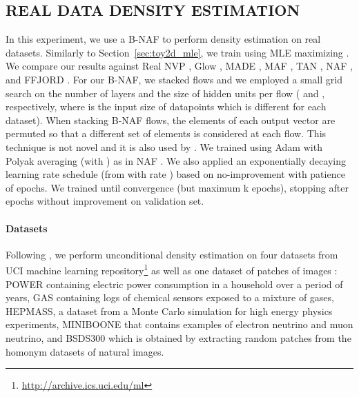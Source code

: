 \documentclass[letterpaper]{article}
\begin{document}
\subsection{REAL DATA DENSITY ESTIMATION} \label{sec:density_estimation}
In this experiment, we use a B-NAF to perform density estimation on  real datasets. Similarly to Section~\ref{sec:toy2d_mle}, we train using MLE maximizing . We compare our results against Real NVP \citep{dinh2016density}, Glow \citep{kingma2018glow}, MADE \citep{germain2015made}, MAF \citep{papamakarios2017masked}, TAN \citep{pmlr-v80-oliva18a}, NAF \citep{huang2018neural}, and FFJORD \citep{grathwohl2018ffjord}. For our B-NAF, we stacked  flows and we employed a small grid search on the number of layers and the size of hidden units per flow ( and , respectively, where  is the input size of datapoints which is different for each dataset). When stacking B-NAF flows, the elements of each output vector are permuted so that a different set of elements is considered at each flow. This technique is not novel and it is also used by \citet{dinh2016density, papamakarios2017masked, kingma2016improved}. We trained using Adam with Polyak averaging (with ) as in NAF \citep{polyak1992acceleration}. We also applied an exponentially decaying learning rate schedule (from  with rate ) based on no-improvement with patience of  epochs. We trained until convergence (but maximum k epochs), stopping after  epochs without improvement on validation set.

\paragraph{Datasets} Following \citet{papamakarios2017masked}, we perform unconditional density estimation on four datasets \citep{dua2017} from UCI machine learning repository\footnote{\url{http://archive.ics.uci.edu/ml}} as well as one dataset of patches of images \citep{martin2001database}: POWER containing electric power consumption in a household over a period of  years, GAS containing logs of  chemical sensors exposed to a mixture of gases, HEPMASS, a dataset from a Monte Carlo simulation for high energy physics experiments, MINIBOONE that contains examples of electron neutrino and muon neutrino, and BSDS300 which is obtained by extracting random patches from the homonym datasets of natural images.
\end{document}
